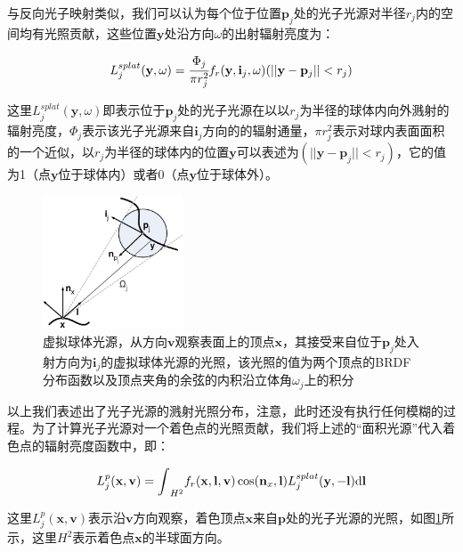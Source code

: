 与反向光子映射类似，我们可以认为每个位于位置$\mathbf{p}_j$处的光子光源对半径$r_j$内的空间均有光照贡献，这些位置$\mathbf{y}$处沿方向$\omega$的出射辐射亮度为：

\begin{equation}\label{e:ir-vpl-splatting}
	L^{splat}_j(\mathbf{y},\omega)= \cfrac{\Phi_j}{\pi r^{2}_j}f_r(\mathbf{y},\mathbf{i}_j,\omega)(||\mathbf{y}-\mathbf{p}_j||<r_j)
\end{equation}

\noindent 这里$L^{splat}_j(\mathbf{y},\omega)$即表示位于$\mathbf{p}_j$处的光子光源在以以$r_j$为半径的球体内向外溅射的辐射亮度，$\Phi_j$表示该光子光源来自$\mathbf{i}_j$方向的的辐射通量，$\pi r^{2}_j$表示对球内表面面积的一个近似，以$r_j$为半径的球体内的位置$\mathbf{y}$可以表述为$(||\mathbf{y}-\mathbf{p}_j||<r_j)$，它的值为1（点$\mathbf{y}$位于球体内）或者0（点$\mathbf{y}$位于球体外）。

\begin{figure}
	\sidecaption
	\includegraphics[width=0.37\textwidth]{figures/ir/vsl}
	\caption{虚拟球体光源，从方向$\mathbf{v}$观察表面上的顶点$\mathbf{x}$，其接受来自位于$\mathbf{p}_j$处入射方向为$\mathbf{i}_j$的虚拟球体光源的光照，该光照的值为两个顶点的BRDF分布函数以及顶点夹角的余弦的内积沿立体角$\omega_j$上的积分}
	\label{f:ir-vsl}
\end{figure}

以上我们表述出了光子光源的溅射光照分布，注意，此时还没有执行任何模糊的过程。为了计算光子光源对一个着色点的光照贡献，我们将上述的“面积光源”代入着色点的辐射亮度函数中，即：

\begin{equation}\label{e:ir-shading-point-radiance}
	L^{p}_j(\mathbf{x},\mathbf{v})={\rm \int}_{H^{2}}f_r(\mathbf{x},\mathbf{l},\mathbf{v})\cos(\mathbf{n}_x,\mathbf{l})L^{splat}_j(\mathbf{y},-\mathbf{l}){\rm d}\mathbf{l}
\end{equation}

\noindent 这里$L^{p}_j(\mathbf{x},\mathbf{v})$表示沿$\mathbf{v}$方向观察，着色顶点$\mathbf{x}$来自$\mathbf{p}$处的光子光源的光照，如图\ref{f:ir-vsl}所示，这里$H^{2}$表示着色点$\mathbf{x}$的半球面方向。

